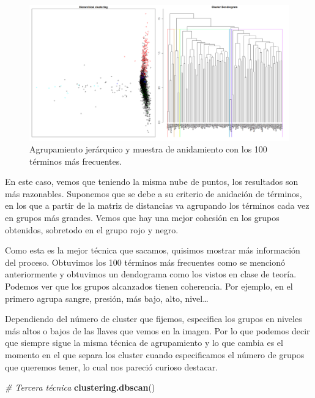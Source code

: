 \documentclass[spanish,]{article}
\newenvironment{Shaded}{\begin{snugshade}}{\end{snugshade}}
\newcommand{\KeywordTok}[1]{\textcolor[rgb]{0.13,0.29,0.53}{\textbf{#1}}}
\newcommand{\CommentTok}[1]{\textcolor[rgb]{0.56,0.35,0.01}{\textit{#1}}}
\newcommand{\NormalTok}[1]{#1}
\begin{document}
\begin{figure}[h]
    \centering
    \includegraphics[width=1\textwidth]{figuras/clustering/jerarquico.png}
    \caption{Agrupamiento jerárquico y muestra de anidamiento con los 100 términos más frecuentes.}
    \label{fig:clustering:jerarquico}
\end{figure}

En este caso, vemos que teniendo la misma nube de puntos, los resultados
son más razonables. Suponemos que se debe a su criterio de anidación de
términos, en los que a partir de la matriz de distancias va agrupando
los términos cada vez en grupos más grandes. Vemos que hay una mejor
cohesión en los grupos obtenidos, sobretodo en el grupo rojo y negro.

Como esta es la mejor técnica que sacamos, quisimos mostrar más
información del proceso. Obtuvimos los 100 términos más frecuentes como
se mencionó anteriormente y obtuvimos un dendograma como los vistos en
clase de teoría. Podemos ver que los grupos alcanzados tienen
coherencia. Por ejemplo, en el primero agrupa sangre, presión, más bajo,
alto, nivel\ldots{}

Dependiendo del número de cluster que fijemos, especifica los grupos en
niveles más altos o bajos de las llaves que vemos en la imagen. Por lo
que podemos decir que siempre sigue la misma técnica de agrupamiento y
lo que cambia es el momento en el que separa los cluster cuando
especificamos el número de grupos que queremos tener, lo cual nos
pareció curioso destacar.

\newpage

\begin{Shaded}
\begin{Highlighting}[]
\CommentTok{# Tercera técnica}
\KeywordTok{clustering.dbscan}\NormalTok{()}
\end{Highlighting}
\end{Shaded}
\end{document}
